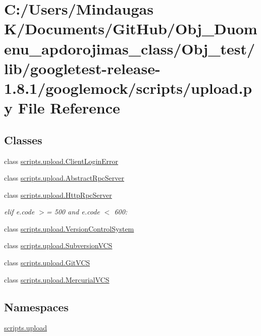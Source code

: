 \hypertarget{_obj__test_2lib_2googletest-release-1_88_81_2googlemock_2scripts_2upload_8py}{}\section{C\+:/\+Users/\+Mindaugas K/\+Documents/\+Git\+Hub/\+Obj\+\_\+\+Duomenu\+\_\+apdorojimas\+\_\+class/\+Obj\+\_\+test/lib/googletest-\/release-\/1.8.1/googlemock/scripts/upload.py File Reference}
\label{_obj__test_2lib_2googletest-release-1_88_81_2googlemock_2scripts_2upload_8py}
\subsection*{Classes}
\begin{DoxyCompactItemize}
\item 
class \mbox{\hyperlink{classscripts_1_1upload_1_1_client_login_error}{scripts.\+upload.\+Client\+Login\+Error}}
\item 
class \mbox{\hyperlink{classscripts_1_1upload_1_1_abstract_rpc_server}{scripts.\+upload.\+Abstract\+Rpc\+Server}}
\item 
class \mbox{\hyperlink{classscripts_1_1upload_1_1_http_rpc_server}{scripts.\+upload.\+Http\+Rpc\+Server}}
\begin{DoxyCompactList}\small\item\em elif e.\+code $>$= 500 and e.\+code $<$ 600\+: \end{DoxyCompactList}\item 
class \mbox{\hyperlink{classscripts_1_1upload_1_1_version_control_system}{scripts.\+upload.\+Version\+Control\+System}}
\item 
class \mbox{\hyperlink{classscripts_1_1upload_1_1_subversion_v_c_s}{scripts.\+upload.\+Subversion\+V\+CS}}
\item 
class \mbox{\hyperlink{classscripts_1_1upload_1_1_git_v_c_s}{scripts.\+upload.\+Git\+V\+CS}}
\item 
class \mbox{\hyperlink{classscripts_1_1upload_1_1_mercurial_v_c_s}{scripts.\+upload.\+Mercurial\+V\+CS}}
\end{DoxyCompactItemize}
\subsection*{Namespaces}
\begin{DoxyCompactItemize}
\item 
 \mbox{\hyperlink{namespacescripts_1_1upload}{scripts.\+upload}}
\end{DoxyCompactItemize}
